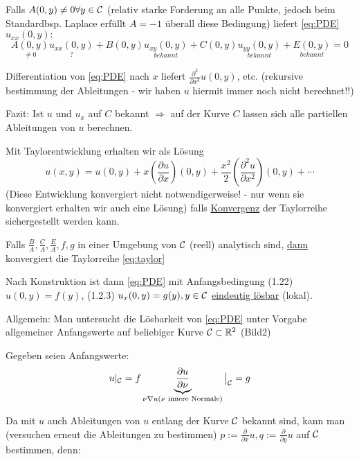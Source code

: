 Falls $A(0,y) \neq 0 \forall y\in \mathcal{C}$ (relativ starke Forderung an alle Punkte, jedoch beim Standardbsp. Laplace erfüllt  $A=-1$ überall diese Bedingung) liefert \eqref{eq:PDE} $u_{xx}(0,y):$
\[
    \underset{\neq 0}{A(0,y)} \underset{?}{u_{xx}(0,y)} + B(0,y) \underset{bekannt}{u_{xy}(0,y)} + C(0,y) \underset{bekannt}{u_{yy}(0,y)} + \underset{bekannt}{E(0,y)} = 0
\]

Differentiation von \eqref{eq:PDE} nach $x$ liefert $\frac{\partial^3}{\partial x^3}u(0,y)$, etc. (rekursive bestimmung der Ableitungen - wir haben $u$ hiermit immer noch nicht berechnet!!)

Fazit: Ist $u$ und $u_x$ auf $C$ bekannt $\Rightarrow$ auf der Kurve $C$ lassen sich alle partiellen Ableitungen von $u$ berechnen.

Mit Taylorentwicklung erhalten wir als Lösung 
\begin{equation} %
    u(x,y) = u(0,y) + x \left( \frac{\partial u}{\partial x} \right)(0,y) + \frac{x^2}{2} \left( \frac{\partial^2 u}{\partial x^2} \right) (0,y) + \cdots
    \label{eq:taylor}
\end{equation}
(Diese Entwicklung konvergiert nicht notwendigerweise! - nur wenn sie konvergiert erhalten wir auch eine Lösung)
falls \underline{Konvergenz} der Taylorreihe sichergestellt werden kann.

\begin{satz}
    Falls $\frac{B}{A}, \frac{C}{A}, \frac{E}{A}, f, g$ in einer Umgebung von $\mathcal{C}$ (reell) analytisch sind,  \underline{dann} konvergiert die Taylorreihe \eqref{eq:taylor}
\end{satz}

Nach Konstruktion ist dann \eqref{eq:PDE} mit Anfangsbedingung (1.22) $u(0,y) = f(y)$, (1.2.3) $u_x(0,y) = g(y), y\in\mathcal{C}$ \underline{eindeutig lösbar} (lokal).

Allgemein: Man untersucht die Lösbarkeit von \eqref{eq:PDE} unter Vorgabe allgemeiner Anfangswerte auf beliebiger Kurve $\mathcal{C}\subset \mathbb{R}^2$ (Bild2) 

Gegeben seien Anfangswerte: 
\begin{equation}[Cauchy-Daten] %
    u|_\Cc = f \\
    \underbrace{\frac{\partial u}{ \partial \nu}}_{\nu \nabla u (\nu \text{ innere Normale})} \big|_\Cc = g
\end{equation}

Da mit $u$ auch Ableitungen von $u$ entlang der Kurve $\mathcal{C}$ bekannt sind, kann man (versuchen erneut die Ableitungen zu bestimmen)  $p:= \frac{\partial}{ \partial x} u, q:=\frac{\partial}{\partial y} u$ auf $\mathcal{C}$ bestimmen, denn:\\

